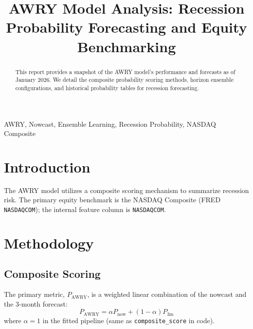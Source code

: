 \documentclass[conference,onecolumn]{IEEEtran}
\begin{document}
\title{AWRY Model Analysis: Recession Probability Forecasting and Equity Benchmarking}

\author{
}

\maketitle

\begin{abstract}
This report provides a snapshot of the AWRY model's performance and forecasts as of January 2026. 
We detail the composite probability scoring methods, horizon ensemble configurations, 
and historical probability tables for recession forecasting.
\end{abstract}

\begin{IEEEkeywords}
AWRY, Nowcast, Ensemble Learning, Recession Probability, NASDAQ Composite
\end{IEEEkeywords}

\section{Introduction}
The AWRY model utilizes a composite scoring mechanism to summarize recession risk. 
The primary equity benchmark is the NASDAQ Composite (FRED \texttt{NASDAQCOM}); 
the internal feature column is \texttt{NASDAQCOM}.

\section{Methodology}

\subsection{Composite Scoring}
The primary metric, $P_{\mathrm{AWRY}}$, is a weighted linear combination of the nowcast and the 3-month forecast:
\begin{equation}
P_{\mathrm{AWRY}} = \alpha P_{\mathrm{now}} + (1-\alpha) P_{\mathrm{3m}}
\label{eq:composite}
\end{equation}
where $\alpha = 1$ in the fitted pipeline (same as \texttt{composite\_score} in code).
\end{document}
